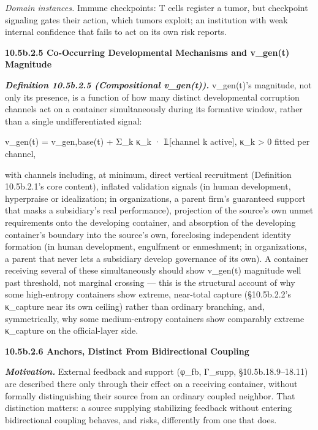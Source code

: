 \documentclass[
]{article}
\begin{document}
\emph{Domain instances.} Immune checkpoints: T cells register a tumor,
but checkpoint signaling gates their action, which tumors exploit; an
institution with weak internal confidence that fails to act on its own
risk reports.

\textbf{10.5b.2.5 Co-Occurring Developmental Mechanisms and v\_gen(t)
Magnitude}

\emph{\textbf{Definition 10.5b.2.5 (Compositional v\_gen(t)).}}
v\_gen(t)'s magnitude, not only its presence, is a function of how many
distinct developmental corruption channels act on a container
simultaneously during its formative window, rather than a single
undifferentiated signal:

v\_gen(t) = v\_gen,base(t) + Σ\_k κ\_k · 𝟙{[}channel k active{]}, κ\_k
\textgreater{} 0 fitted per channel,

with channels including, at minimum, direct vertical recruitment
(Definition 10.5b.2.1's core content), inflated validation signals (in
human development, hyperpraise or idealization; in organizations, a
parent firm's guaranteed support that masks a subsidiary's real
performance), projection of the source's own unmet requirements onto the
developing container, and absorption of the developing container's
boundary into the source's own, foreclosing independent identity
formation (in human development, engulfment or enmeshment; in
organizations, a parent that never lets a subsidiary develop governance
of its own). A container receiving several of these simultaneously
should show v\_gen(t) magnitude well past threshold, not marginal
crossing --- this is the structural account of why some high-entropy
containers show extreme, near-total capture (§10.5b.2.2's κ\_capture
near its own ceiling) rather than ordinary branching, and,
symmetrically, why some medium-entropy containers show comparably
extreme κ\_capture on the official-layer side.

\textbf{10.5b.2.6 Anchors, Distinct From Bidirectional Coupling}

\emph{\textbf{Motivation.}} External feedback and support (φ\_fb,
Γ\_supp, §10.5b.18.9--18.11) are described there only through their
effect on a receiving container, without formally distinguishing their
source from an ordinary coupled neighbor. That distinction matters: a
source supplying stabilizing feedback without entering bidirectional
coupling behaves, and risks, differently from one that does.
\end{document}
